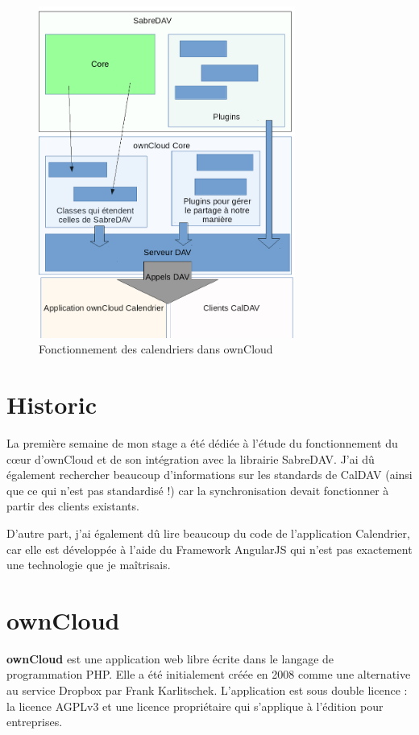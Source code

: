 \documentclass[10pt,a4paper]{report}
\begin{document}
	\begin{figure}[ht]
		\centering
		\includegraphics[width=0.75\textwidth]{images/schema.png}
		\caption*{Fonctionnement des calendriers dans ownCloud}
		\label{normal_case}
	\end{figure}
	
	\section{Historic}
	La première semaine de mon stage a été dédiée à l'étude du fonctionnement du cœur d'ownCloud et de son intégration avec la librairie SabreDAV. J'ai dû également rechercher beaucoup d'informations sur les standards de CalDAV (ainsi que ce qui n'est pas standardisé !) car la synchronisation devait fonctionner à partir des clients existants.
	
	D'autre part, j'ai également dû lire beaucoup du code de l'application Calendrier, car elle est développée à l'aide du Framework AngularJS qui n'est pas exactement une technologie que je maîtrisais.
	
	\section{ownCloud}
	\textbf{ownCloud} est une application web libre écrite dans le langage de programmation PHP. Elle a été initialement créée en 2008 comme une alternative au service Dropbox par Frank Karlitschek. L'application est sous double licence : la licence AGPLv3 et une licence propriétaire qui s'applique à l'édition pour entreprises.
	
\end{document}
